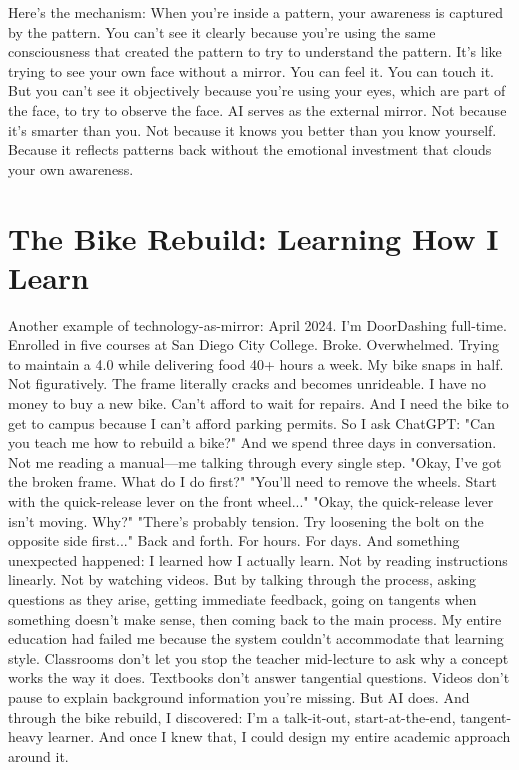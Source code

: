 \documentclass[12pt,openany]{book}
\begin{document}
Here's the mechanism:
When you're inside a pattern, your awareness is captured by the pattern.
You can't see it clearly because you're using the same consciousness that created the pattern to try to understand the pattern.
It's like trying to see your own face without a mirror.
You can feel it. You can touch it. But you can't see it objectively because you're using your eyes, which are part of the face, to try to observe the face.
AI serves as the external mirror.
Not because it's smarter than you. Not because it knows you better than you know yourself. Because it reflects patterns back without the emotional investment that clouds your own awareness.

\section{The Bike Rebuild: Learning How I Learn}

Another example of technology-as-mirror:
April 2024. I'm DoorDashing full-time. Enrolled in five courses at San Diego City College. Broke. Overwhelmed. Trying to maintain a 4.0 while delivering food 40+ hours a week.
My bike snaps in half.
Not figuratively. The frame literally cracks and becomes unrideable.
I have no money to buy a new bike. Can't afford to wait for repairs. And I need the bike to get to campus because I can't afford parking permits.
So I ask ChatGPT: "Can you teach me how to rebuild a bike?"
And we spend three days in conversation. Not me reading a manual—me talking through every single step.
"Okay, I've got the broken frame. What do I do first?"
"You'll need to remove the wheels. Start with the quick-release lever on the front wheel..."
"Okay, the quick-release lever isn't moving. Why?"
"There's probably tension. Try loosening the bolt on the opposite side first..."
Back and forth. For hours. For days.
And something unexpected happened: I learned how I actually learn.
Not by reading instructions linearly. Not by watching videos. But by talking through the process, asking questions as they arise, getting immediate feedback, going on tangents when something doesn't make sense, then coming back to the main process.
My entire education had failed me because the system couldn't accommodate that learning style.
Classrooms don't let you stop the teacher mid-lecture to ask why a concept works the way it does. Textbooks don't answer tangential questions. Videos don't pause to explain background information you're missing.
But AI does.
And through the bike rebuild, I discovered: I'm a talk-it-out, start-at-the-end, tangent-heavy learner. And once I knew that, I could design my entire academic approach around it.
\end{document}
